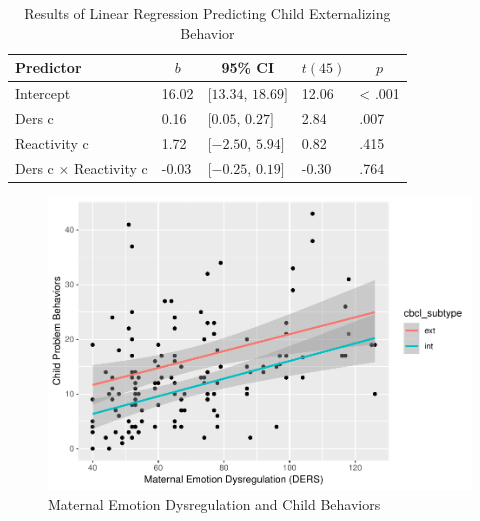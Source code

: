 \documentclass[man]{apa6}
\begin{document}
\begin{table}[tbp]
\begin{center}
\begin{threeparttable}
\caption{\label{tab:linear regression externalizing}Results of Linear Regression Predicting Child Externalizing Behavior}
\begin{tabular}{lllll}
\toprule
Predictor & \multicolumn{1}{c}{$b$} & \multicolumn{1}{c}{95\% CI} & \multicolumn{1}{c}{$t(45)$} & \multicolumn{1}{c}{$p$}\\
\midrule
Intercept & 16.02 & $[13.34$, $18.69]$ & 12.06 & < .001\\
Ders c & 0.16 & $[0.05$, $0.27]$ & 2.84 & .007\\
Reactivity c & 1.72 & $[-2.50$, $5.94]$ & 0.82 & .415\\
Ders c $\times$ Reactivity c & -0.03 & $[-0.25$, $0.19]$ & -0.30 & .764\\
\bottomrule
\end{tabular}
\end{threeparttable}
\end{center}
\end{table}

\begin{figure}
\centering
\includegraphics{DataPrepScript_apa_style_files/figure-latex/plot1-1.pdf}
\caption{\label{fig:plot1}Maternal Emotion Dysregulation and Child
Behaviors}
\end{figure}
\end{document}
